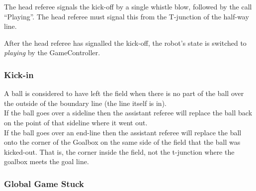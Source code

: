 


The head referee signals the kick-off by a single whistle blow, followed by the call ``Playing''. The head referee must signal this from the T-junction of the half-way line.

After the head referee has signalled the kick-off, the robot's state is switched to \emph{playing} by the GameController.

\subsubsection{Kick-in}
\label{sec:kick_in}

A ball is considered to have left the field when there is no part of the ball over the outside of the boundary line (\ie the line itself is in). \\
If the ball goes over a sideline then the assistant referee will replace the ball back on the point of that sideline where it went out. \\
If the ball goes over an end-line then the assistant referee will replace the ball onto the corner of the Goalbox on the same side of the field that the ball was kicked-out. That is, the corner inside the field, not the t-junction where the goalbox meets the goal line.

\subsubsection{Global Game Stuck}
\label{sec:game_stuck:global}

